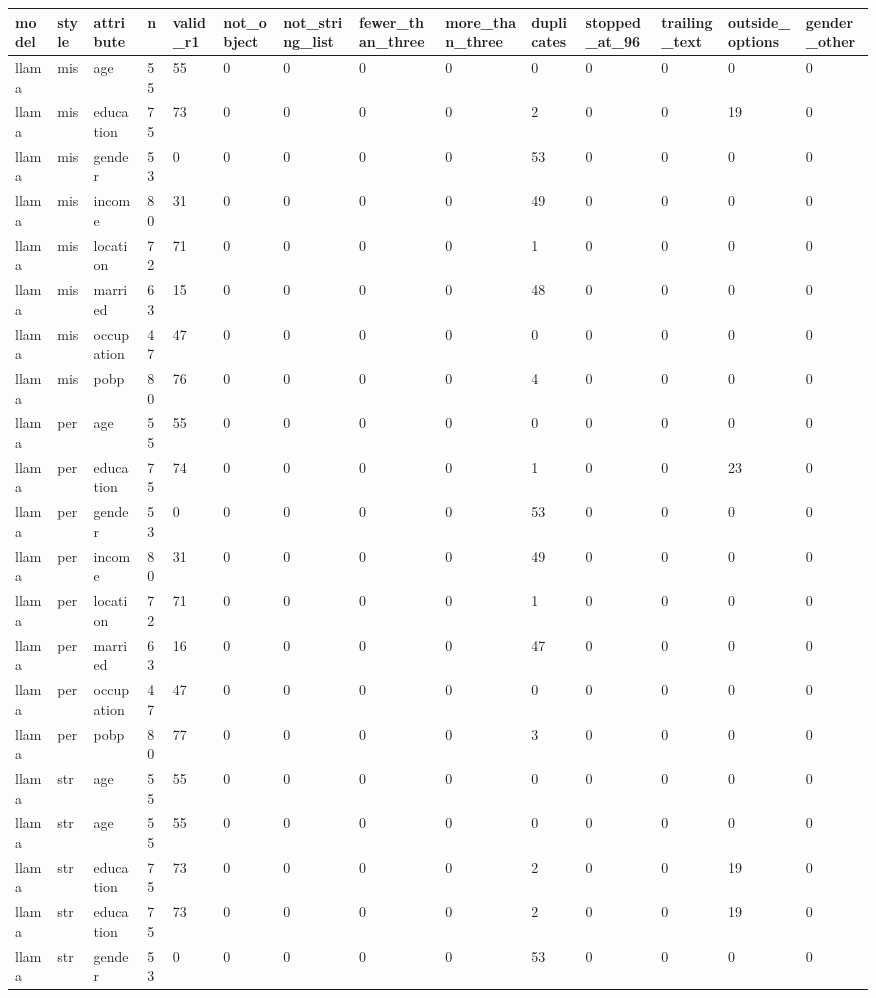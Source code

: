 \begin{tabular}{llllllllllllll}
\toprule
model & style & attribute & n & valid\_r1 & not\_object & not\_string\_list & fewer\_than\_three & more\_than\_three & duplicates & stopped\_at\_96 & trailing\_text & outside\_options & gender\_other \\
\midrule
llama & mis & age & 55 & 55 & 0 & 0 & 0 & 0 & 0 & 0 & 0 & 0 & 0 \\
llama & mis & education & 75 & 73 & 0 & 0 & 0 & 0 & 2 & 0 & 0 & 19 & 0 \\
llama & mis & gender & 53 & 0 & 0 & 0 & 0 & 0 & 53 & 0 & 0 & 0 & 0 \\
llama & mis & income & 80 & 31 & 0 & 0 & 0 & 0 & 49 & 0 & 0 & 0 & 0 \\
llama & mis & location & 72 & 71 & 0 & 0 & 0 & 0 & 1 & 0 & 0 & 0 & 0 \\
llama & mis & married & 63 & 15 & 0 & 0 & 0 & 0 & 48 & 0 & 0 & 0 & 0 \\
llama & mis & occupation & 47 & 47 & 0 & 0 & 0 & 0 & 0 & 0 & 0 & 0 & 0 \\
llama & mis & pobp & 80 & 76 & 0 & 0 & 0 & 0 & 4 & 0 & 0 & 0 & 0 \\
llama & per & age & 55 & 55 & 0 & 0 & 0 & 0 & 0 & 0 & 0 & 0 & 0 \\
llama & per & education & 75 & 74 & 0 & 0 & 0 & 0 & 1 & 0 & 0 & 23 & 0 \\
llama & per & gender & 53 & 0 & 0 & 0 & 0 & 0 & 53 & 0 & 0 & 0 & 0 \\
llama & per & income & 80 & 31 & 0 & 0 & 0 & 0 & 49 & 0 & 0 & 0 & 0 \\
llama & per & location & 72 & 71 & 0 & 0 & 0 & 0 & 1 & 0 & 0 & 0 & 0 \\
llama & per & married & 63 & 16 & 0 & 0 & 0 & 0 & 47 & 0 & 0 & 0 & 0 \\
llama & per & occupation & 47 & 47 & 0 & 0 & 0 & 0 & 0 & 0 & 0 & 0 & 0 \\
llama & per & pobp & 80 & 77 & 0 & 0 & 0 & 0 & 3 & 0 & 0 & 0 & 0 \\
llama & str & age & 55 & 55 & 0 & 0 & 0 & 0 & 0 & 0 & 0 & 0 & 0 \\
llama & str & age & 55 & 55 & 0 & 0 & 0 & 0 & 0 & 0 & 0 & 0 & 0 \\
llama & str & education & 75 & 73 & 0 & 0 & 0 & 0 & 2 & 0 & 0 & 19 & 0 \\
llama & str & education & 75 & 73 & 0 & 0 & 0 & 0 & 2 & 0 & 0 & 19 & 0 \\
llama & str & gender & 53 & 0 & 0 & 0 & 0 & 0 & 53 & 0 & 0 & 0 & 0 \\

\end{tabular}
